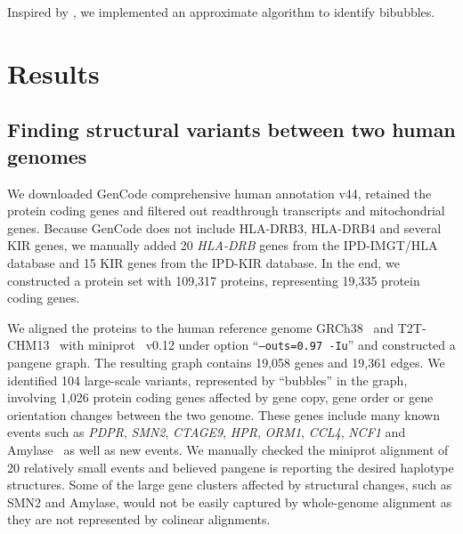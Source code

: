 \documentclass[webpdf,contemporary,large,namedate]{oup-authoring-template}%
\begin{document}
Inspired by \citet{DBLP:conf/pldi/JohnsonPP94}, we implemented an approximate algorithm to identify bibubbles.

\section{Results}

\subsection{Finding structural variants between two human genomes}

We downloaded GenCode comprehensive human annotation v44,
retained the protein coding genes and filtered out readthrough transcripts and mitochondrial genes.
Because GenCode does not include HLA-DRB3, HLA-DRB4 and several KIR genes,
we manually added 20 {\it HLA-DRB} genes from the IPD-IMGT/HLA database and
15 KIR genes from the IPD-KIR database.
In the end, we constructed a protein set with 109,317 proteins, representing 19,335 protein coding genes.

We aligned the proteins to the human reference genome GRCh38~\citep{Schneider:2017aa} and T2T-CHM13~\citep{Nurk:2022up}
with miniprot~\citep{Li:2023ac} v0.12 under option ``{\tt --outs=0.97 -Iu}''
and constructed a pangene graph.
The resulting graph contains 19,058 genes and 19,361 edges.
We identified 104 large-scale variants, represented by ``bubbles'' in the graph,
involving 1,026 protein coding genes affected by gene copy, gene order or gene orientation changes between the two genome.
These genes include many known events such as {\it PDPR}, {\it SMN2}, {\it CTAGE9}, {\it HPR}, {\it ORM1}, {\it CCL4}, {\it NCF1} and Amylase~\citep{Handsaker:2015ur,Sudmant:2010aa}
as well as new events.
We manually checked the miniprot alignment of 20 relatively small events
and believed pangene is reporting the desired haplotype structures.
Some of the large gene clusters affected by structural changes, such as SMN2 and Amylase,
would not be easily captured by whole-genome alignment as they are not represented by colinear alignments.
\end{document}
